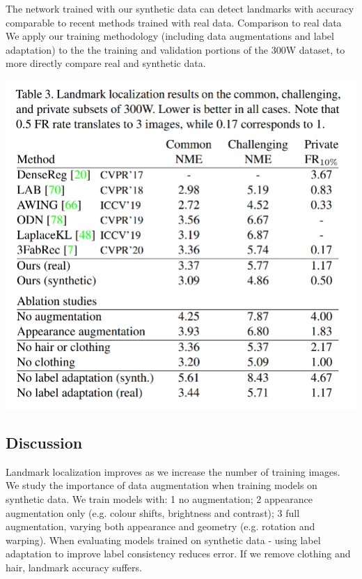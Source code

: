 \documentclass[12pt]{article}
\begin{document}
The network trained with our synthetic data can detect landmarks with accuracy comparable to recent methods trained with real data.
Comparison to real data We apply our training methodology (including data augmentations and label adaptation) to
the the training and validation portions of the 300W dataset,
to more directly compare real and synthetic data.
\begin{center}
\includegraphics[scale = 0.7]{img2.png}
\end{center}
\subsection{Discussion}
Landmark localization improves as we increase the number of training images. We study the importance of data augmentation when
training models on synthetic data. We train models with:
1 no augmentation; 2 appearance augmentation only (e.g.
colour shifts, brightness and contrast); 3 full augmentation,
varying both appearance and geometry (e.g. rotation and
warping). When evaluating models trained on synthetic data - using
label adaptation to improve label consistency reduces error. If we remove clothing and hair, landmark accuracy suffers.
\end{document}
